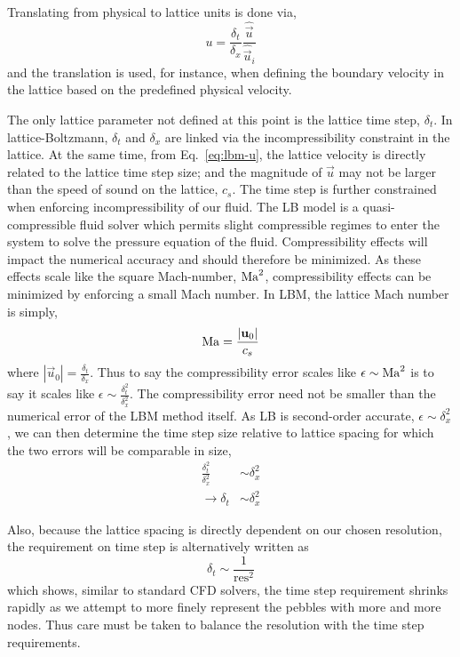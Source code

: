 Translating from physical to lattice units is done via,
\begin{equation}
	u = \frac{\delta_t}{\delta_x}\frac{\hat{\vec{u}}}{\hat{\vec{u}}_i}
\end{equation}
and the translation is used, for instance, when defining the boundary velocity in the lattice based on the predefined physical velocity.

The only lattice parameter not defined at this point is the lattice time step, $\delta_t$. In lattice-Boltzmann, $\delta_t$ and $\delta_x$ are linked via the incompressibility constraint in the lattice. At the same time, from Eq.~\ref{eq:lbm-u}, the lattice velocity is directly related to the lattice time step size; and the magnitude of $\vec{u}$ may not be larger than the speed of sound on the lattice, $c_s$. The time step is further constrained when enforcing incompressibility of our fluid. The LB model is a quasi-compressible fluid solver which permits slight compressible regimes to enter the system to solve the pressure equation of the fluid. Compressibility effects will impact the numerical accuracy and should therefore be minimized. As these effects scale like the square Mach-number, $\mathrm{Ma}^2$, compressibility effects can be minimized by enforcing a small Mach number. In LBM, the lattice Mach number is simply,
\begin{equation}
 	\mathrm{Ma} = \frac{|\mathbf{u}_0|}{c_s}
\end{equation}
where $|\vec{u}_0| = \frac{\delta_t}{\delta_x}$. Thus to say the compressibility error scales like $\epsilon \sim \mathrm{Ma}^2$ is to say it scales like $\epsilon \sim \frac{\delta_t^2}{\delta_x^2}$. The compressibility error need not be smaller than the numerical error of the LBM method itself. As LB is second-order accurate\cite{succi2001lattice}, $\epsilon \sim \delta_x^2$, we can then determine the time step size relative to lattice spacing for which the two errors will be comparable in size,
\begin{align*}
	\frac{\delta_t^2}{\delta_x^2} &\sim \delta_x^2\\
	\rightarrow \delta_t &\sim \delta_x^2
\end{align*}

Also, because the lattice spacing is directly dependent on our chosen resolution, the requirement on time step is alternatively written as
\begin{equation}
	\delta_t \sim \frac{1}{\text{res}^2}
\end{equation}
which shows, similar to standard CFD solvers, the time step requirement shrinks rapidly as we attempt to more finely represent the pebbles with more and more nodes. Thus care must be taken to balance the resolution with the time step requirements.

